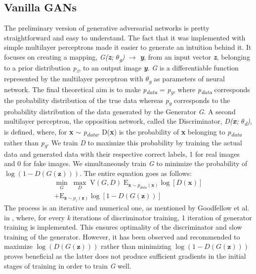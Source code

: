 \documentclass[10pt,journal,compsoc]{IEEEtran}
\begin{document}
\subsection{Vanilla GANs}
The preliminary version of generative adversarial networks is pretty straightforward and easy to understand. The fact that it was implemented with simple multilayer perceptrons made it easier to generate an intuition behind it. It focuses on creating a mapping, \textit{G(\textbf{z}; $\theta$\textsubscript{g})}  $\rightarrow$ \textbf{\textit{y}}, from an input vector \textbf{\textit{z}}, belonging to a prior distribution  \textit{p\textsubscript{z}}, to an output image \textbf{\textit{y}}. \textit{G} is a differentiable function represented by the multilayer perceptron with \textit{$\theta$\textsubscript{g}} as parameters of neural network. The final theoretical aim is to make \textit{p\textsubscript{data}} = \textit{p\textsubscript{g}}, where \textit{p\textsubscript{data}} corresponds the probability distribution of the true data whereas  \textit{p\textsubscript{g}} corresponds to the probability distribution of the data generated by the Generator \textit{G}. A second multilayer perceptron, the opposition network, called the Discriminator, \textit{D(\textbf{x}; $\theta$\textsubscript{d})}, is defined, where, for \textbf{x} $\sim$ \textit{p\textsubscript{data}}, D(\textbf{x}) is the probability of \textbf{x} belonging to \textit{p\textsubscript{data}} rather than \textit{p\textsubscript{g}}. We train \textit{D} to maximize this probability by training the actual data and generated data with their respective correct labels, 1 for real images and 0 for fake images. We simultaneously train \textit{G} to minimize the probability of $\log(1- \textit{D}(\textit{G}(\textbf{z})))$. The entire equation goes as follows:%
\begin{multline}
\mathop{min}_{G}\; \mathop{max}_{D}\; \mbox{V}(G,D)\; \mbox{E}_{\textbf{x}\sim p_{data}(\textbf{x})} \log[D(\textbf{x})]\\
+ \mbox{E}_{\textbf{z}\sim p_{z}(\textbf{z})} \log[1 - \textit{D}({\textit{G}}(\textbf{z}))]
\end{multline}
The process is an iterative and numerical one, as mentioned by Goodfellow et al. in \cite{vanillagans}, where, for every \textit{k} iterations of discriminator training, 1 iteration of generator training is implemented. This ensures optimality of the discriminator and slow training of the generator. However, it has been observed and recommended to maximize $\log(\textit{D}(\textit{G}(\textbf{z})))$ rather than minimizing $\log(1- \textit{D}(\textit{G}(\textbf{z})))$ proves beneficial as the latter does not produce sufficient gradients in the initial stages of training in order to train \textit{G} well.
\end{document}
